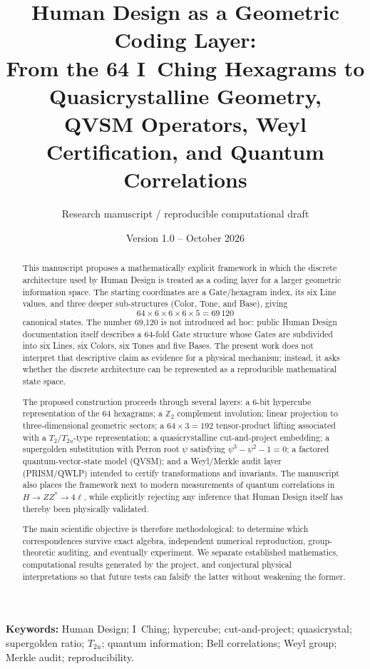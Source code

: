 \documentclass[11pt,a4paper]{article}
\title{\textbf{Human Design as a Geometric Coding Layer:}\\
From the 64 I~Ching Hexagrams to Quasicrystalline Geometry,\\
QVSM Operators, Weyl Certification, and Quantum Correlations}
\author{Research manuscript / reproducible computational draft}
\date{Version 1.0 -- October 2026}
\numberwithin{equation}{section}
\begin{document}
\maketitle

\begin{abstract}
This manuscript proposes a mathematically explicit framework in which the discrete architecture used by Human Design is treated as a coding layer for a larger geometric information space. The starting coordinates are a Gate/hexagram index, its six Line values, and three deeper sub-structures (Color, Tone, and Base), giving
\[
64\times6\times6\times6\times5=69\,120
\]
canonical states. The number 69,120 is not introduced ad hoc: public Human Design documentation itself describes a 64-fold Gate structure whose Gates are subdivided into six Lines, six Colors, six Tones and five Bases. The present work does not interpret that descriptive claim as evidence for a physical mechanism; instead, it asks whether the discrete architecture can be represented as a reproducible mathematical state space.

The proposed construction proceeds through several layers: a 6-bit hypercube representation of the 64 hexagrams; a $\mathbb Z_2$ complement involution; linear projection to three-dimensional geometric sectors; a $64\times3=192$ tensor-product lifting associated with a $T_2/T_{2u}$-type representation; a quasicrystalline cut-and-project embedding; a supergolden substitution with Perron root $\psi$ satisfying $\psi^3-\psi^2-1=0$; a factored quantum-vector-state model (QVSM); and a Weyl/Merkle audit layer (PRISM/QWLP) intended to certify transformations and invariants. The manuscript also places the framework next to modern measurements of quantum correlations in $H\to ZZ^*\to4\ell$, while explicitly rejecting any inference that Human Design itself has thereby been physically validated.

The main scientific objective is therefore methodological: to determine which correspondences survive exact algebra, independent numerical reproduction, group-theoretic auditing, and eventually experiment. We separate established mathematics, computational results generated by the project, and conjectural physical interpretations so that future tests can falsify the latter without weakening the former.
\end{abstract}

\textbf{Keywords:} Human Design; I~Ching; hypercube; cut-and-project; quasicrystal; supergolden ratio; $T_{2u}$; quantum information; Bell correlations; Weyl group; Merkle audit; reproducibility.
\end{document}
